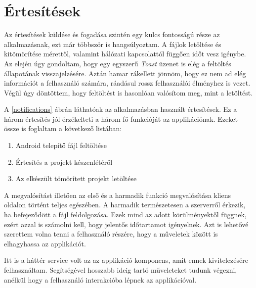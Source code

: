 \documentclass{thesis-ekf}
\theoremstyle{definition}
\theoremstyle{remark}
\begin{document}
\section{Értesítések}\label{ertesitesek}

Az értesítések küldése és fogadása szintén egy kulcs fontosságú része az alkalmazásnak, ezt már többször is hangsúlyoztam.
A fájlok letöltése és kitömörítése mérettől, valamint hálózati kapcsolattól függően időt vesz igénybe.
Az elején úgy gondoltam, hogy egy egyszerű \emph{Toast} üzenet is elég a feltöltés állapotának visszajelzésére.
Aztán hamar rákellett jönnöm, hogy ez nem ad elég információt a felhasználó számára, ráadásul rossz felhasználói élményhez is vezet.
Végül úgy döntöttem, hogy feltöltést is hasonlóan valósítom meg, mint a letöltést.

A \ref{notifications} ábrán láthatóak az alkalmazásban használt értesítések.
Ez a három értesítés jól érzékelteti a három fő funkcióját az applikációnak.
Ezeket össze is foglaltam a következő listában:

\begin{enumerate}
	\item Android telepítő fájl feltöltése
	\item Értesítés a projekt készenlétéről
	\item Az elkészült tömörített projekt letöltése
\end{enumerate}

A megvalósítást illetően az első és a harmadik funkció megvalósítása kliens oldalon történt teljes egészében.
A harmadik természetesen a szerverről érkezik, ha befejeződött a fájl feldolgozása.
Ezek mind az adott körülményektől függnek, ezért azzal is számolni kell, hogy jelentős időtartamot igényelnek.
Azt is lehetővé szerettem volna tenni a felhasználó részére, hogy a műveletek között is elhagyhassa az applikációt.

Itt is a háttér service volt az az applikáció komponens, amit ennek kivitelezésére felhasználtam.
Segítségével hosszabb ideig tartó műveleteket tudunk végezni, anélkül hogy a felhasználó interakcióba lépnek az applikációval.
\end{document}

